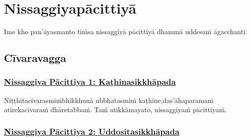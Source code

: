 
\section{Nissaggiyapācittiyā}
\label{np}

\begin{intro}
	Ime kho pan'āyasmanto tiṁsa nissaggiyā pācittiyā dhammā uddesaṁ āgacchanti.
\end{intro}

\setsubsecheadstyle{\subsectionFmt}
\subsection{Cīvaravagga}

\subsubsection*{\hyperref[forf-exp1]{Nissaggiya Pācittiya 1: Kaṭhinasikkhāpada}}
\label{np1}

Niṭṭhitacīvarasmiṁ\makeatletter\hyperlink{endnote119-appendix}\makeatother \thinspace bhikkhunā ubbhatasmiṁ kaṭhine,\makeatletter\hyperlink{endnote120-appendix}\makeatother \thinspace das'āhaparamaṁ atirekacīvaraṁ dhāretabbaṁ. Taṁ atikkāmayato, nissaggiyaṁ pācittiyaṁ.



\subsubsection*{\hyperref[forf-exp2]{Nissaggiya Pācittiya 2: Uddositasikkhāpada}}
\label{np2}

